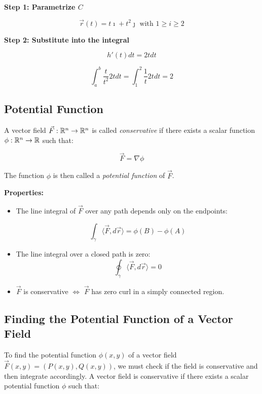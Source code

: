 \textbf{Step 1: Parametrize \(C\)}

\[
    \vec{r}(t) = t\imath + t^2 \jmath \text{ with } 1 \ge i \ge 2
\]

\textbf{Step 2: Substitute into the integral}

\[
    h'(t)dt= 2t dt
\]

\[
    \int_{a}^{b} \frac{t}{t^2} 2tdt = \int_{1}^{2} \frac{1}{t} 2tdt = 2 
\]

\subsection{Potential Function}

A vector field \( \vec{F} : \mathbb{R}^n \to \mathbb{R}^n \) is called \emph{conservative} if there exists a scalar function \( \phi : \mathbb{R}^n \to \mathbb{R} \) such that:

\[
    \vec{F} = \nabla \phi
\]

The function \( \phi \) is then called a \emph{potential function} of \( \vec{F} \).
\vspace{\baselineskip}

\textbf{Properties:}

\begin{itemize}

    \item The line integral of \( \vec{F} \) over any path depends only on the endpoints:

    \[
    \int_\gamma \langle \vec{F}, d\vec{r} \rangle = \phi(B) - \phi(A)
    \]

    \item The line integral over a closed path is zero:
    \[
    \oint_\gamma \langle \vec{F}, d\vec{r} \rangle = 0
    \]

    \item \( \vec{F} \) is conservative \( \Leftrightarrow \) \( \vec{F} \) has zero curl in a 
    simply connected region.

\end{itemize}

\subsection{Finding the Potential Function of a Vector Field}

To find the potential function \( \phi(x, y) \) of a vector field \( \vec{F}(x, y) = (P(x, y), Q(x, y)) \), we must check if the field is conservative and then integrate accordingly. A vector field is conservative if there exists a scalar potential function \( \phi \) such that:

